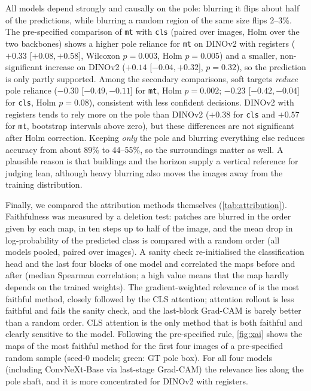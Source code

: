 \documentclass[11pt]{article}
\newcommand{\cls}{\texttt{cls}}
\newcommand{\mt}{\texttt{mt}}
\begin{document}
All models depend strongly and causally on the pole: blurring it flips about half of the predictions, while
blurring a random region of the same size flips 2--3\%. The pre-specified comparison of \mt{} with \cls{} (paired
over images, Holm over the two backbones) shows a higher pole reliance for \mt{} on DINOv2 with registers
($+0.33$ [$+0.08, +0.58$], Wilcoxon $p = 0.003$, Holm $p = 0.005$) and a smaller, non-significant increase on
DINOv2 ($+0.14$ [$-0.04, +0.32$], $p = 0.32$), so the prediction is only partly supported. Among the secondary
comparisons, soft targets \emph{reduce} pole reliance ($-0.30$ [$-0.49, -0.11$] for \mt{}, Holm $p = 0.002$;
$-0.23$ [$-0.42, -0.04$] for \cls{}, Holm $p = 0.08$), consistent with less confident decisions. DINOv2 with
registers tends to rely more on the pole than DINOv2 ($+0.38$ for \cls{} and $+0.57$ for \mt{}, bootstrap
intervals above zero), but these differences are not significant after Holm correction. Keeping \emph{only} the
pole and blurring everything else reduces accuracy from about 89\% to 44--55\%, so the surroundings matter as
well. A plausible reason is that buildings and the horizon supply a vertical reference for judging lean, although
heavy blurring also moves the images away from the training distribution.

Finally, we compared the attribution methods themselves (\cref{tab:attribution}). Faithfulness was measured by
a deletion test: patches are blurred in the order given by each map, in ten steps up to half of the image, and
the mean drop in log-probability of the predicted class is compared with a random order (all models pooled,
paired over images). A sanity check re-initialised the classification head and the last four blocks of one
model and correlated the maps before and after (median Spearman correlation; a high value means that the map
hardly depends on the trained weights). The gradient-weighted relevance of \citet{chefer2021transformer} is the
most faithful method, closely followed by the CLS attention; attention rollout \citep{abnar2020attention} is
less faithful and fails the sanity check, and the last-block Grad-CAM is barely better than a random order.
CLS attention is the only method that is both faithful and clearly sensitive to the model. Following the
pre-specified rule, \cref{fig:xai} shows the maps of the most faithful method for the first four images of a
pre-specified random sample (seed-0 models; green: GT pole box). For all four models (including ConvNeXt-Base via last-stage Grad-CAM) the relevance lies along the pole shaft, and it
is more concentrated for DINOv2 with registers.
\end{document}
